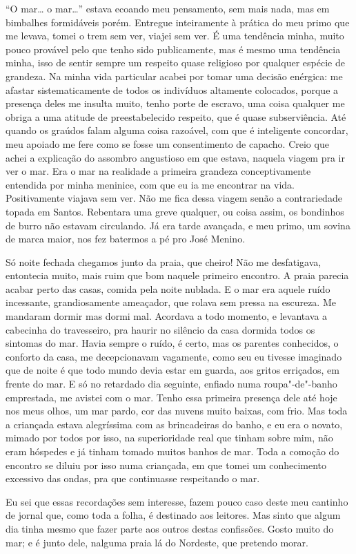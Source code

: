 ``O mar\ldots{} o mar\ldots{}'' estava ecoando meu pensamento, sem mais nada, mas
em bimbalhes formidáveis porém. Entregue inteiramente à prática do meu
primo que me levava, tomei o trem sem ver, viajei sem ver. É uma
tendência minha, muito pouco provável pelo que tenho sido publicamente,
mas é mesmo uma tendência minha, isso de sentir sempre um respeito quase
religioso por qualquer espécie de grandeza. Na minha vida particular
acabei por tomar uma decisão enérgica: me afastar sistematicamente de
todos os indivíduos altamente colocados, porque a presença deles me
insulta muito, tenho porte de escravo, uma coisa qualquer me obriga a
uma atitude de preestabelecido respeito, que é quase subserviência. Até
quando os graúdos falam alguma coisa razoável, com que é inteligente
concordar, meu apoiado me fere como se fosse um consentimento de
capacho. Creio que achei a explicação do assombro angustioso em que
estava, naquela viagem pra ir ver o mar. Era o mar na realidade a
primeira grandeza conceptivamente entendida por minha meninice, com que
eu ia me encontrar na vida. Positivamente viajava sem ver. Não me fica
dessa viagem senão a contrariedade topada em Santos. Rebentara uma greve
qualquer, ou coisa assim, os bondinhos de burro não estavam circulando.
Já era tarde avançada, e meu primo, um sovina de marca maior, nos fez
batermos a pé pro José Menino.

Só noite fechada chegamos junto da praia, que cheiro! Não me
desfatigava, entontecia muito, mais ruim que bom naquele primeiro
encontro. A praia parecia acabar perto das casas, comida pela noite
nublada. E o mar era aquele ruído incessante, grandiosamente ameaçador,
que rolava sem pressa na escureza. Me mandaram dormir mas dormi mal.
Acordava a todo momento, e levantava a cabecinha do travesseiro, pra
haurir no silêncio da casa dormida todos os sintomas do mar. Havia
sempre o ruído, é certo, mas os parentes conhecidos, o conforto da casa,
me decepcionavam vagamente, como seu eu tivesse imaginado que de noite é
que todo mundo devia estar em guarda, aos gritos erriçados, em frente do
mar. E só no retardado dia seguinte, enfiado numa roupa"-de"-banho
emprestada, me avistei com o mar. Tenho essa primeira presença dele até
hoje nos meus olhos, um mar pardo, cor das nuvens muito baixas, com
frio. Mas toda a criançada estava alegríssima com as brincadeiras do
banho, e eu era o novato, mimado por todos por isso, na superioridade
real que tinham sobre mim, não eram hóspedes e já tinham tomado muitos
banhos de mar. Toda a comoção do encontro se diluiu por isso numa
criançada, em que tomei um conhecimento excessivo das ondas, pra que
continuasse respeitando o mar.

Eu sei que essas recordações sem interesse, fazem pouco caso deste meu
cantinho de jornal que, como toda a folha, é destinado aos leitores. Mas
sinto que algum dia tinha mesmo que fazer parte aos outros destas
confissões. Gosto muito do mar; e é junto dele, nalguma praia lá do
Nordeste, que pretendo morar.

